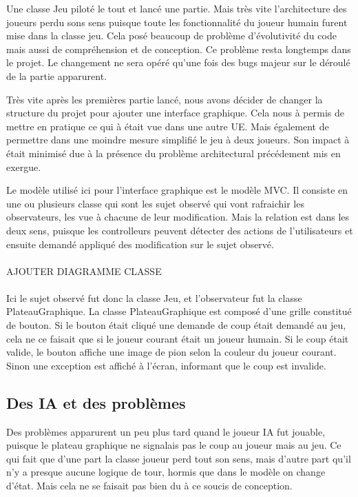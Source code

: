 \documentclass[12pt, legalpaper]{article}
\begin{document}
Une classe Jeu piloté le tout et lancé une partie.
Mais très vite l'architecture des joueurs perdu sons sens puisque toute les fonctionnalité
du joueur humain furent mise dans la classe jeu. Cela posé beaucoup de problème d'évolutivité du code
mais aussi de compréhension et de conception. Ce problème resta longtemps dans le projet. 
Le changement ne sera opéré qu'une fois des bugs majeur sur le déroulé de la partie apparurent.
\\\par
Très vite après les premières partie lancé, nous avons décider de changer la structure du
projet pour ajouter une interface graphique. Cela nous à permis de mettre en pratique ce
qui à était vue dans une autre UE. Mais également de permettre dans une moindre mesure
simplifié le jeu à deux joueurs.
Son impact à était minimisé due à la présence du problème architectural précédement 
mis en exergue.
\\\par
Le modèle utilisé ici pour l'interface graphique est le modèle MVC. Il consiste en
une ou plusieurs classe qui sont les sujet observé qui vont rafraichir les observateurs,
les vue à chacune de leur modification. Mais la relation est dans les deux sens, puisque
les controlleurs peuvent détecter des actions de l'utilisateurs et ensuite demandé
appliqué des modification sur le sujet observé.
\\\\
AJOUTER DIAGRAMME CLASSE
\\\\
Ici le sujet observé fut donc la classe Jeu, et l'observateur fut la classe PlateauGraphique.
La classe PlateauGraphique est composé d'une grille constitué de bouton.
Si le bouton était cliqué une demande de coup était demandé au jeu, cela ne ce faisait
que si le joueur courant était un joueur humain. Si le coup était valide, le bouton
affiche une image de pion selon la couleur du joueur courant. Sinon une exception est
affiché à l'écran, informant que le coup est invalide.

\subsection{Des IA et des problèmes}
Des problèmes apparurent un peu plus tard quand le joueur IA fut jouable, puisque
le plateau graphique ne signalais pas le coup au joueur mais au jeu. Ce qui fait que
d'une part la classe joueur perd tout son sens, mais d'autre part qu'il n'y a presque
aucune logique de tour, hormis que dans le modèle on change d'état. Mais cela ne se 
faisait pas bien du à ce soucis de conception.
\end{document}
